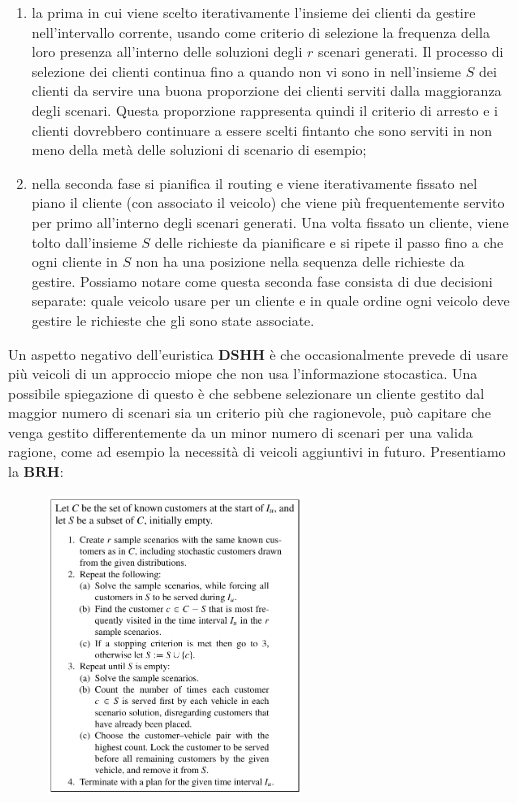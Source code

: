 \documentclass[
]{article}
\providecommand{\tightlist}{%
  \setlength{\itemsep}{0pt}\setlength{\parskip}{0pt}}
\begin{document}
\begin{enumerate}
\tightlist
\item
  la prima in cui viene scelto iterativamente l'insieme dei clienti da
  gestire nell'intervallo corrente, usando come criterio di selezione la
  frequenza della loro presenza all'interno delle soluzioni degli
  {\(r\)} scenari generati. Il processo di selezione dei clienti
  continua fino a quando non vi sono in nell'insieme {\(S\)} dei clienti
  da servire una buona proporzione dei clienti serviti dalla maggioranza
  degli scenari. Questa proporzione rappresenta quindi il criterio di
  arresto e i clienti dovrebbero continuare a essere scelti fintanto che
  sono serviti in non meno della metà delle soluzioni di scenario di
  esempio;
\item
  nella seconda fase si pianifica il routing e viene iterativamente
  fissato nel piano il cliente (con associato il veicolo) che viene più
  frequentemente servito per primo all'interno degli scenari generati.
  Una volta fissato un cliente, viene tolto dall'insieme {\(S\)} delle
  richieste da pianificare e si ripete il passo fino a che ogni cliente
  in {\(S\)} non ha una posizione nella sequenza delle richieste da
  gestire. Possiamo notare come questa seconda fase consista di due
  decisioni separate: quale veicolo usare per un cliente e in quale
  ordine ogni veicolo deve gestire le richieste che gli sono state
  associate.
\end{enumerate}

Un aspetto negativo dell'euristica {\(\mathbf{DSHH}\)} è che
occasionalmente prevede di usare più veicoli di un approccio miope che
non usa l'informazione stocastica. Una possibile spiegazione di questo è
che sebbene selezionare un cliente gestito dal maggior numero di scenari
sia un criterio più che ragionevole, può capitare che venga gestito
differentemente da un minor numero di scenari per una valida ragione,
come ad esempio la necessità di veicoli aggiuntivi in futuro.
Presentiamo la {\(\mathbf{BRH}\)}:

\begin{figure}
    \centering
    \includegraphics[width=0.6\textwidth,height=\textheight]{Images/InnerLoopDDSH.png}
\end{figure}
\end{document}
